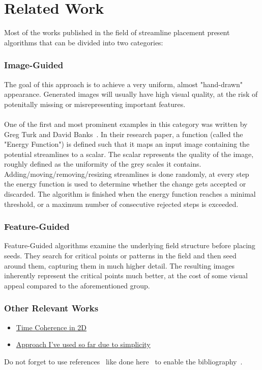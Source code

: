 
\chapter{Related Work}
\label{sec:relatedWork}

Most of the works published in the field of streamline placement present algorithms that can be divided into two categories:
\subsection{Image-Guided}
The goal of this approach is to achieve a very uniform, almost "hand-drawn" appearance.
Generated images will usually have high visual quality, at the risk of potenitally missing or misrepresenting important features.
\\\\
One of the first and most prominent examples in this category was written by Greg Turk and David Banks~\cite{TurkBanks}.
In their research paper, a function (called the "Energy Function") is defined such that it maps an input image containing the potential streamlines to a scalar.
The scalar represents the quality of the image, roughly defined as the uniformity of the grey scales it contains. 
Adding/moving/removing/resizing streamlines is done randomly, at every step the energy function is used to determine whether the change gets accepted or discarded.
The algorithm is finished when the energy function reaches a minimal threshold, or a maximum number of consecutive rejected steps is exceeded.


\subsection{Feature-Guided}
Feature-Guided algorithms examine the underlying field structure before placing seeds.
They search for critical points or patterns in the field and then seed around them, capturing them in much higher detail.
The resulting images inherently represent the critical points much better, at the cost of some visual appeal compared to the aforementioned group.
\bigskip

\subsection{Other Relevant Works}
\begin{itemize}
    \item \href{https://www.cs.purdue.edu/homes/xmt/papers/Coherent-Streamline_Tsinghua_2012.pdf}{Time Coherence in 2D}
    \item \href{https://www.cg.tuwien.ac.at/courses/Visualisierung1/2015W/exercises/Streamlines_Jobard&Lefer.pdf}{Approach I've used so far due to simplicity}
\end{itemize}

Do not forget to use references~\cite{Hanser2019energy} like done here~\cite{Hofmann2019dependentVectors} to enable the bibliography~\cite{Jung2017tumble, Sagrista2019GaiaSky, Sdeo2018fullerene, Zheng2019equivalence}.